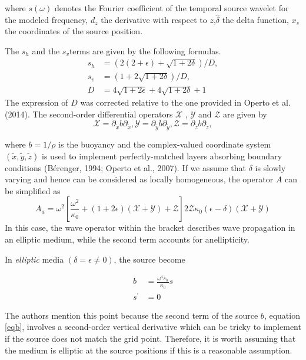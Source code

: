 where $s(\omega)$ denotes the Fourier coefficient of the temporal source wavelet for the modeled frequency, $d_z$ the derivative with respect to $z$,$\hat{\delta}$ the delta function, $x_s$ the coordinates of the source position. 

The $s_h$ and the $s_v$terms are given by the following formulas.
\begin{align}
s_h &= (2(2+\epsilon)+ \sqrt{1+2\delta})/D, \\
s_v &= (1+2\sqrt{1+2\delta})/D, \\
D &=  4\sqrt{1+2\epsilon} + 4 \sqrt{1+2\delta} + 1
\end{align}
The expression of $ D $ was corrected relative to the one provided in Operto et al. (2014). \newline
The second-order differential operators $  \mathcal{X}$ , $ \mathcal{Y}$ and $ \mathcal{Z}$ are given by
$$ \mathcal{X} = \partial_{\tilde{x}} b  \partial_{\tilde{x}},  \mathcal{Y} = \partial_{\tilde{y}} b  \partial_{\tilde{y}},  \mathcal{Z} = \partial_{\tilde{z}} b  \partial_{\tilde{z}},  $$

where $b=1/\rho$ is the buoyancy and the complex-valued coordinate system $(\tilde{x}, \tilde{y}, \tilde{z})$ is used to implement perfectly-matched layers absorbing boundary conditions (Bérenger, 1994; Operto et al., 2007).
If we assume that $\delta$ is slowly varying and hence can be considered as locally homogeneous, the operator $ A $ can be simplified as
\begin{equation}
A_{a} = \omega^{2} \left[ \frac{\omega^{2}}{\kappa_{0}} + (1+2 \epsilon) (\mathcal{X} + \mathcal{Y}) + \mathcal{Z} \right] 2 \mathcal{Z}\kappa_{0} (\epsilon - \delta)  (\mathcal{X} + \mathcal{Y}) \label{eq13}
\end{equation}
In this case, the wave operator within the bracket describes wave propagation in an elliptic medium,
while the second term accounts for anellipticity.

In \textit{elliptic} media $ (\delta=\epsilon \neq 0 ) $, the source become

\begin{align}
b &= \frac{\omega^{4} s_h}{\kappa_{0}} s \\
s^{'} &= 0
\end{align}

The authors mention  this point because the second term of the source $b$, equation \ref{eqb}, involves a second-order vertical derivative which can be tricky to implement if the source does not match the grid point. Therefore, it is worth assuming that the medium is elliptic at the source positions if this is a reasonable assumption.

